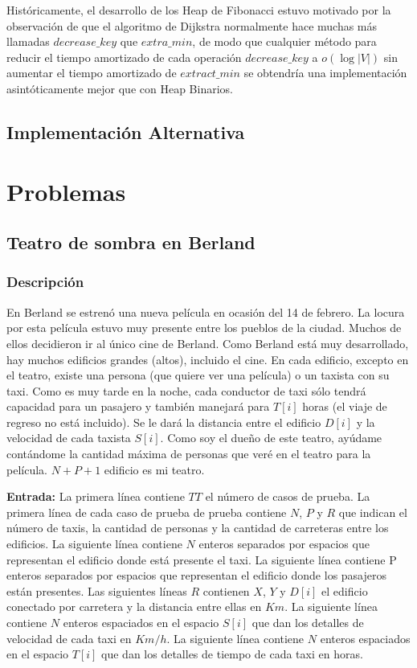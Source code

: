\documentclass[12pt]{article}
\newcommand{\nl}{\vspace{0.3cm}}
\begin{document}
\nl

Históricamente, el desarrollo de los Heap de Fibonacci estuvo motivado por la observación de que el algoritmo de Dijkstra normalmente hace muchas más llamadas $decrease\_key$ que $extra\_min$, de modo que cualquier método para reducir el tiempo amortizado de cada operación $decrease\_key$ a $o(\log|V|)$ sin aumentar el tiempo amortizado de $extract\_min$ se obtendría una implementación asintóticamente mejor que con Heap Binarios.

\subsection{Implementación Alternativa}



\section{Problemas}

\subsection{Teatro de sombra en Berland}

\subsubsection{Descripción}

En Berland se estrenó una nueva película en ocasión del 14 de febrero. La locura por esta película estuvo muy presente entre los pueblos de la ciudad. Muchos de ellos decidieron ir al único cine de Berland. Como Berland está muy desarrollado, hay muchos edificios grandes (altos), incluido el cine. En cada edificio, excepto en el teatro, existe una persona (que quiere ver una película) o un taxista con su taxi. Como es muy tarde en la noche, cada conductor de taxi sólo tendrá capacidad para un pasajero y también manejará para $T[i]$ horas (el viaje de regreso no está incluido). Se le dará la distancia entre el edificio $D [i]$ y la velocidad de cada taxista $S[i]$. Como soy el dueño de este teatro, ayúdame contándome la cantidad máxima de personas que veré en el teatro para la película. $N + P + 1$ edificio es mi teatro.

\nl

\textbf{Entrada:} La primera línea contiene $TT$ el número de casos de prueba. La primera línea de cada caso de prueba de prueba contiene $N$, $P$ y $R$ que indican el número de taxis, la cantidad de personas y la cantidad de carreteras entre los edificios. La siguiente línea contiene $N$ enteros separados por espacios que representan el edificio donde está presente el taxi. La siguiente línea contiene P enteros separados por espacios que representan el edificio donde los pasajeros están presentes. Las siguientes líneas $R$ contienen $X$, $Y$ y $D[i]$ el edificio conectado por carretera y la distancia entre ellas en $Km$. La siguiente línea contiene $N$ enteros espaciados en el espacio $S[i]$ que dan los detalles de velocidad de cada taxi en $Km/h$. La siguiente línea contiene $N$ enteros espaciados en el espacio $T[i]$ que dan los detalles de tiempo de cada taxi en horas.
\end{document}
